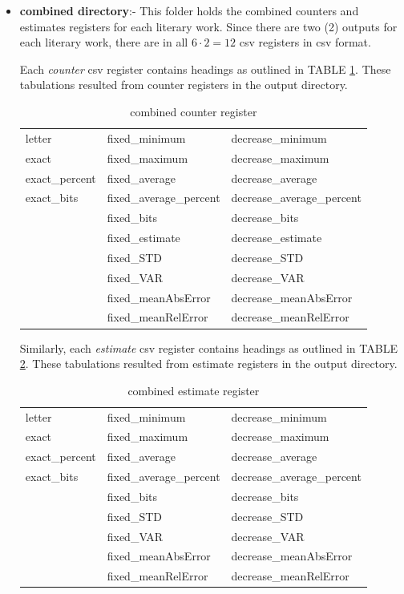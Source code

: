 \documentclass[longpaper, english, final, times]{revdetua}
\begin{document}
\begin{itemize}
			\item \textbf{combined directory}:- This folder holds the combined counters and estimates registers for each literary work. Since there are two (2) outputs for each literary work, there are in all $6\cdot 2=12$ csv registers in csv format.
			
			Each \textit{counter} csv register contains headings as outlined in TABLE \ref{table:combinedCounterRegister}. These tabulations resulted from counter registers in the output directory.\\
			\begin{table}[!ht]
				\caption{combined counter register}
				\hskip-0.6cm
				\begin{tabular}{l|l|l}
					letter&fixed\_minimum&decrease\_minimum\\
					exact&fixed\_maximum&decrease\_maximum\\
					exact\_percent&fixed\_average&decrease\_average\\
					exact\_bits&fixed\_average\_percent&decrease\_average\_percent\\
					&fixed\_bits&decrease\_bits\\
					&fixed\_estimate&decrease\_estimate\\
					&fixed\_STD&decrease\_STD\\
					&fixed\_VAR&decrease\_VAR\\
					&fixed\_meanAbsError&decrease\_meanAbsError\\
					&fixed\_meanRelError&decrease\_meanRelError\\
				\end{tabular}
				\label{table:combinedCounterRegister}
			\end{table}
		
			Similarly, each \textit{estimate} csv register contains headings as outlined in TABLE \ref{table:combinedEstimateRegister}. These tabulations resulted from estimate registers in the output directory.\\
			\begin{table}[!ht]
				\caption{combined estimate register}
				\hskip-0.6cm
				\begin{tabular}{l|l|l}
					letter&fixed\_minimum&decrease\_minimum\\
					exact&fixed\_maximum&decrease\_maximum\\
					exact\_percent&fixed\_average&decrease\_average\\
					exact\_bits&fixed\_average\_percent&decrease\_average\_percent\\
					&fixed\_bits&decrease\_bits\\
					&fixed\_STD&decrease\_STD\\
					&fixed\_VAR&decrease\_VAR\\
					&fixed\_meanAbsError&decrease\_meanAbsError\\
					&fixed\_meanRelError&decrease\_meanRelError\\
				\end{tabular}
				\label{table:combinedEstimateRegister}
			\end{table}
			

\end{itemize}
\end{document}

